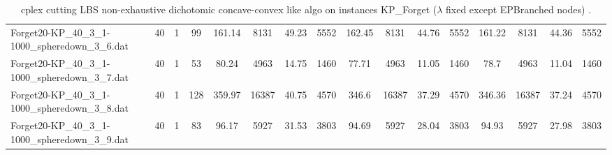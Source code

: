 \begin{sidewaystable}[!ht]
{\begin{tabular}{lccccccccccccccc}
Forget20-KP\_40\_3\_1-1000\_spheredown\_3\_6.dat & 40 & 1 & 99 & 161.14 & 8131 & 49.23 & 5552 & 162.45 & 8131 & 44.76 & 5552 & 161.22 & 8131 & 44.36 & 5552 \\
Forget20-KP\_40\_3\_1-1000\_spheredown\_3\_7.dat & 40 & 1 & 53 & 80.24 & 4963 & 14.75 & 1460 & 77.71 & 4963 & 11.05 & 1460 & 78.7 & 4963 & 11.04 & 1460 \\
Forget20-KP\_40\_3\_1-1000\_spheredown\_3\_8.dat & 40 & 1 & 128 & 359.97 & 16387 & 40.75 & 4570 & 346.6 & 16387 & 37.29 & 4570 & 346.36 & 16387 & 37.24 & 4570 \\
Forget20-KP\_40\_3\_1-1000\_spheredown\_3\_9.dat & 40 & 1 & 83 & 96.17 & 5927 & 31.53 & 3803 & 94.69 & 5927 & 28.04 & 3803 & 94.93 & 5927 & 27.98 & 3803 \\
\bottomrule
\end{tabular}
}%
\caption{cplex cutting LBS non-exhaustive dichotomic concave-convex like algo on instances KP_Forget ($\lambda$ fixed except EPBranched nodes) .}
\end{sidewaystable}
